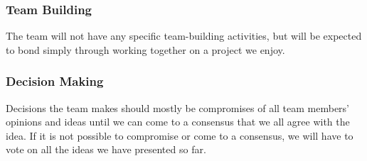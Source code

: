 \subsubsection*{Team Building}

The team will not have any specific team-building activities, but will be expected to bond simply through working together on a project we enjoy.

\subsubsection*{Decision Making}

Decisions the team makes should mostly be compromises of all team members' 
opinions and ideas until we can come to a consensus that we all agree with the 
idea. If it is not possible to compromise or come to a consensus, we will have 
to vote on all the ideas we have presented so far.